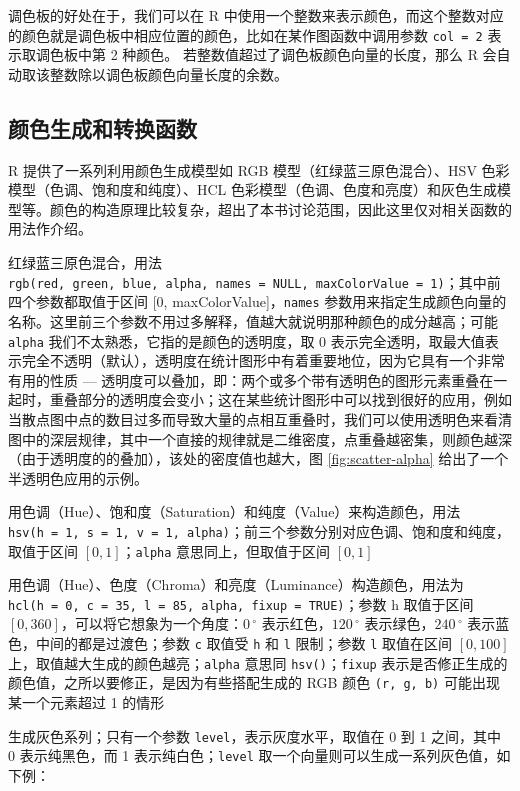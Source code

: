 \documentclass[
  b5paper,
  UTF8,twoside]{book}
\providecommand{\tightlist}{%
  \setlength{\itemsep}{0pt}\setlength{\parskip}{0pt}}
\begin{document}
调色板的好处在于，我们可以在 R 中使用一个整数来表示颜色，而这个整数对应的颜色就是调色板中相应位置的颜色，比如在某作图函数中调用参数 \texttt{col\ =\ 2} 表示取调色板中第 2 种颜色。 若整数值超过了调色板颜色向量的长度，那么 R 会自动取该整数除以调色板颜色向量长度的余数。

\subsection{颜色生成和转换函数}\label{ux989cux8272ux751fux6210ux548cux8f6cux6362ux51fdux6570}

R 提供了一系列利用颜色生成模型如 RGB 模型（红绿蓝三原色混合）、HSV 色彩模型（色调、饱和度和纯度）、HCL 色彩模型（色调、色度和亮度）和灰色生成模型等。颜色的构造原理比较复杂，超出了本书讨论范围，因此这里仅对相关函数的用法作介绍。

\begin{description}
\tightlist
\item[\texttt{rgb()}]
红绿蓝三原色混合，用法 \texttt{rgb(red,\ green,\ blue,\ alpha,\ names\ =\ NULL,\ maxColorValue\ =\ 1)}；其中前四个参数都取值于区间 {[}0, maxColorValue{]}，\texttt{names} 参数用来指定生成颜色向量的名称。这里前三个参数不用过多解释，值越大就说明那种颜色的成分越高；可能 \texttt{alpha} 我们不太熟悉，它指的是颜色的透明度，取 0 表示完全透明，取最大值表示完全不透明（默认），透明度在统计图形中有着重要地位，因为它具有一个非常有用的性质 --- 透明度可以叠加，即：两个或多个带有透明色的图形元素重叠在一起时，重叠部分的透明度会变小；这在某些统计图形中可以找到很好的应用，例如当散点图中点的数目过多而导致大量的点相互重叠时，我们可以使用透明色来看清图中的深层规律，其中一个直接的规律就是二维密度，点重叠越密集，则颜色越深（由于透明度的的叠加），该处的密度值也越大，图 \ref{fig:scatter-alpha} 给出了一个半透明色应用的示例。
\item[\texttt{hsv()}]
用色调（Hue）、饱和度（Saturation）和纯度（Value）来构造颜色，用法 \texttt{hsv(h\ =\ 1,\ s\ =\ 1,\ v\ =\ 1,\ alpha)}；前三个参数分别对应色调、饱和度和纯度，取值于区间 \([0, 1]\)；\texttt{alpha} 意思同上，但取值于区间 \([0, 1]\)
\item[\texttt{hcl()}]
用色调（Hue）、色度（Chroma）和亮度（Luminance）构造颜色，用法为 \texttt{hcl(h\ =\ 0,\ c\ =\ 35,\ l\ =\ 85,\ alpha,\ fixup\ =\ TRUE)}；参数 h 取值于区间 \([0, 360]\)，可以将它想象为一个角度：\(0\,^{\circ}\) 表示红色，\(120\,^{\circ}\) 表示绿色，\(240\,^{\circ}\) 表示蓝色，中间的都是过渡色；参数 \texttt{c} 取值受 \texttt{h} 和 \texttt{l} 限制；参数 \texttt{l} 取值在区间 \([0, 100]\) 上，取值越大生成的颜色越亮；\texttt{alpha} 意思同 \texttt{hsv()}；\texttt{fixup} 表示是否修正生成的颜色值，之所以要修正，是因为有些搭配生成的 RGB 颜色 \texttt{(r,\ g,\ b)} 可能出现某一个元素超过 1 的情形
\item[\texttt{gray(),\ grey()}]
生成灰色系列；只有一个参数 \texttt{level}，表示灰度水平，取值在 0 到 1 之间，其中 0 表示纯黑色，而 1 表示纯白色；\texttt{level} 取一个向量则可以生成一系列灰色值，如下例：
\end{description}
\end{document}
